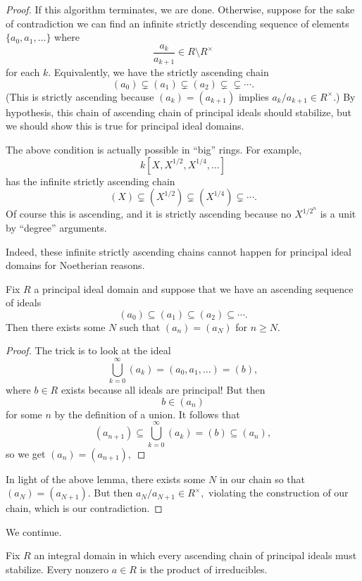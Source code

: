 \begin{proof}
    If this algorithm terminates, we are done. Otherwise, suppose for the sake of contradiction we can find an infinite strictly descending sequence of elements $\{a_0,a_1,\ldots\}$ where
    \[\frac{a_k}{a_{k+1}}\in R\setminus R^\times\]
    for each $k.$ Equivalently, we have the strictly ascending chain
    \[(a_0)\subsetneq(a_1)\subsetneq(a_2)\subsetneq\subsetneq\cdots.\]
    (This is strictly ascending because $(a_k)=(a_{k+1})$ implies $a_k/a_{k+1}\in R^\times.$) By hypothesis, this chain of ascending chain of principal ideals should stabilize, but we should show this is true for principal ideal domains.
    \begin{remark}
        The above condition is actually possible in ``big'' rings. For example,
        \[k\left[X,X^{1/2},X^{1/4},\ldots\right]\]
        has the infinite strictly ascending chain
        \[(X)\subsetneq\left(X^{1/2}\right)\subsetneq\left(X^{1/4}\right)\subsetneq\cdots.\]
        Of course this is ascending, and it is strictly ascending because no $X^{1/2^n}$ is a unit by ``degree'' arguments.
    \end{remark}
    Indeed, these infinite strictly ascending chains cannot happen for principal ideal domains for Noetherian reasons.
    \begin{lemma}
        Fix $R$ a principal ideal domain and suppose that we have an ascending sequence of ideals
        \[(a_0)\subseteq(a_1)\subseteq(a_2)\subseteq\cdots.\]
        Then there exists some $N$ such that $(a_n)=(a_N)$ for $n\ge N.$
    \end{lemma}
    \begin{proof}
        The trick is to look at the ideal
        \[\bigcup_{k=0}^\infty(a_k)=(a_0,a_1,\ldots)=(b),\]
        where $b\in R$ exists because all ideals are principal! But then
        \[b\in (a_n)\]
        for some $n$ by the definition of a union. It follows that
        \[(a_{n+1})\subseteq\bigcup_{k=0}^\infty(a_k)=(b)\subseteq(a_n),\]
        so we get $(a_n)=(a_{n+1}),$ 
    \end{proof}
    In light of the above lemma, there exists some $N$ in our chain so that $(a_N)=(a_{N+1}).$ But then $a_N/a_{N+1}\in R^\times,$ violating the construction of our chain, which is our contradiction.
\end{proof}
We continue.
\begin{proposition} \label{prop:existfact}
    Fix $R$ an integral domain in which every ascending chain of principal ideals must stabilize. Every nonzero $a\in R$ is the product of irreducibles.
\end{proposition}
